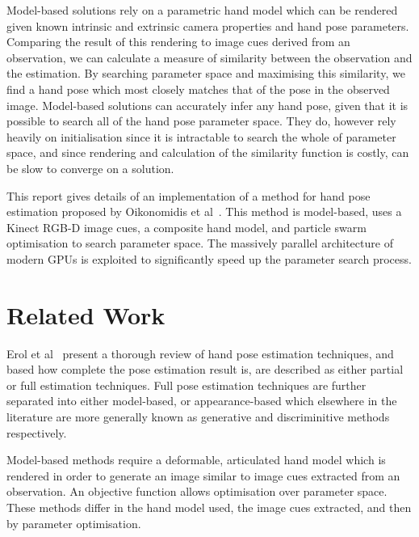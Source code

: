 \documentclass[10pt,a4paper,notitlepage,twocolumn]{report}
\begin{document}
Model-based solutions rely on a parametric hand model which can be rendered 
given known intrinsic and extrinsic camera properties and hand pose parameters.  
Comparing the result of this rendering to image cues derived from an 
observation, we can calculate a measure of similarity between the observation 
and the estimation.  By searching parameter space and maximising this 
similarity, we find a hand pose which most closely matches that of the pose in 
the observed image.  Model-based solutions can accurately infer any hand pose, 
given that it is possible to search all of the hand pose parameter space.  They 
do, however rely heavily on initialisation since it is intractable to search the 
whole of parameter space, and since rendering and calculation of the similarity 
function is costly, can be slow to converge on a solution.

This report gives details of an implementation of a method for hand pose 
estimation proposed by Oikonomidis et al~\cite{bmvc2011oikonom}.  This method is 
model-based, uses a Kinect RGB-D image cues, a composite hand model, and 
particle swarm optimisation to search parameter space.  The massively parallel 
architecture of modern GPUs is exploited to significantly speed up the parameter 
search process.

\section{Related Work}
Erol et al~\cite{erol2007vision} present a thorough review of hand pose 
estimation techniques, and based how complete the pose estimation result is, are 
described as either partial or full estimation techniques.  Full pose estimation 
techniques are further separated into either model-based, or appearance-based 
which elsewhere in the literature are more generally known as generative and 
discriminitive methods respectively.  

Model-based methods require a deformable, articulated hand model which is 
rendered in order to generate an image similar to image cues extracted from an 
observation.  An objective function allows optimisation over parameter space.  
These methods differ in the hand model used, the image cues extracted, and then 
by parameter optimisation. 
\end{document}
